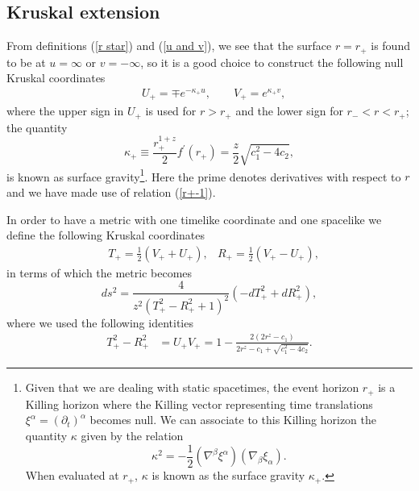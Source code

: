 \documentclass[sn-mathphys,Numbered]{sn-jnl}%
\theoremstyle{thmstyleone}%
\theoremstyle{thmstyletwo}%
\theoremstyle{thmstylethree}%
\begin{document}
\subsection{Kruskal extension}
From definitions (\ref{r star}) and (\ref{u and v}), we see that the surface $r=r_+$ is found to be at $u=\infty$ or $v=-\infty$, so it is a good choice to construct the following null Kruskal coordinates
%
\begin{align} \label{coord Kruskal}
&U_{+}=\mp e^{-\kappa_{+} u}, \quad \quad V_{+}=e^{\kappa_{+} v},
\end{align}
%
where the upper sign in $U_+$ is used for $r>r_+$ and the lower sign for $r_-<r<r_+$; the quantity
%
\begin{equation} \label{surface grav}
\kappa_{+} \equiv \frac{r_{+}^{1+z}}{2} f^{\prime}\left(r_{+}\right)= \frac{z}{2} \sqrt{c_1^2-4c_2}, 
\end{equation}
%
is known as surface gravity\footnote{Given that we are dealing with static spacetimes, the event horizon $r_+$ is a Killing horizon where the Killing vector representing time translations  $\xi^\alpha=\left(\partial_t\right)^\alpha$ becomes null. We can associate to this Killing horizon the quantity $\kappa$ given by the relation
\begin{equation}
    \kappa^{2}=-\frac{1}{2}\left(\nabla^{\beta} \xi^{\alpha}\right)\left(\nabla_{\beta} \xi_{\alpha}\right).
\end{equation}
When evaluated at $r_+$, $\kappa$ is known as the surface gravity $\kappa_+ 
$.}. Here the prime denotes derivatives with respect to $r$ and we have made use of relation (\ref{r+-1}).

In order to have a metric with one timelike coordinate and one spacelike we define the following Kruskal coordinates
%
 \begin{align} \label{T y R}
       &T_+=\frac{1}{2}\left(V_+ + U_+\right), &R_+=\frac{1}{2}\left(V_+ - U_+\right),
   \end{align}
%
in terms of which the metric becomes
%
\begin{equation} \label{metrica T y R}
    d s^2 = 
    \frac{4}{z^2 \left(T_{+}^2-R_{+}^2+1\right)^2} \left(-dT_+^2+dR_+^2\right),
\end{equation}
%
where we used the following identities 
%
\begin{align}\label{T R de r}
    T_+^2-R_+^2&=U_+V_+=
    1- \frac{2\left(2r^z-c_1\right)}{2r^z-c_1+\sqrt{c_{1}^2-4c_2}}.
\end{align}
\end{document}
